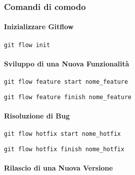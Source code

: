 \subsubsection*{Comandi di comodo}
\paragraph*{Inizializzare Gitflow}

\begin{lstlisting}[style=code]
    git flow init
    \end{lstlisting}
    
    \paragraph*{Sviluppo di una Nuova Funzionalità}
    
    \begin{lstlisting}[style=code]
    git flow feature start nome_feature
    \end{lstlisting}
    
    
    \begin{lstlisting}[style=code]
    git flow feature finish nome_feature
    \end{lstlisting}
    
    \paragraph*{Risoluzione di Bug}
    
    \begin{lstlisting}[style=code]
    git flow hotfix start nome_hotfix
    \end{lstlisting}
    
    
    \begin{lstlisting}[style=code]
    git flow hotfix finish nome_hotfix
    \end{lstlisting}
    
    \paragraph*{Rilascio di una Nuova Versione}
    

